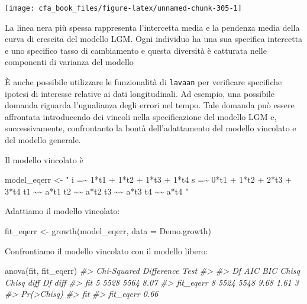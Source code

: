 \documentclass[
  11pt,
]{krantz}
\makeatletter
\newenvironment{Shaded}{\begin{snugshade}}{\end{snugshade}}
\newcommand{\AttributeTok}[1]{\textcolor[rgb]{0.61,0.61,0.61}{#1}}
\newcommand{\CommentTok}[1]{\textcolor[rgb]{0.37,0.37,0.37}{\textit{#1}}}
\newcommand{\FunctionTok}[1]{\textcolor[rgb]{0,0,0}{#1}}
\newcommand{\NormalTok}[1]{#1}
\newcommand{\OtherTok}[1]{\textcolor[rgb]{0.37,0.37,0.37}{#1}}
\newcommand{\StringTok}[1]{\textcolor[rgb]{0.5,0.5,0.5}{#1}}
\newenvironment{kframe}{%
\medskip{}
\setlength{\fboxsep}{.8em}
 \def\at@end@of@kframe{}%
 \ifinner\ifhmode%
  \def\at@end@of@kframe{\end{minipage}}%
  \begin{minipage}{\columnwidth}%
 \fi\fi%
 \def\FrameCommand##1{\hskip\@totalleftmargin \hskip-\fboxsep
 \colorbox{shadecolor}{##1}\hskip-\fboxsep
     \hskip-\linewidth \hskip-\@totalleftmargin \hskip\columnwidth}%
 \MakeFramed {\advance\hsize-\width
   \@totalleftmargin\z@ \linewidth\hsize
   \@setminipage}}%
 {\par\unskip\endMakeFramed%
 \at@end@of@kframe}
\renewenvironment{Shaded}{\begin{kframe}}{\end{kframe}}
\theoremstyle{definition}
\theoremstyle{definition}
\theoremstyle{definition}
\theoremstyle{definition}
\theoremstyle{remark}
\makeatother
\begin{document}
\begin{center}\texttt{[image: cfa\_book\_files/figure-latex/unnamed-chunk-305-1]} \end{center}

La linea nera più spessa rappresenta l'intercetta media e la pendenza media della curva di crescita del modello LGM. Ogni individuo ha una sua specifica intercetta e uno specifico tasso di cambiamento e questa diversità è catturata nelle componenti di varianza del modello

È anche possibile utilizzare le funzionalità di \texttt{lavaan} per verificare specifiche ipotesi di interesse relative ai dati longitudinali. Ad esempio, una possibile domanda riguarda l'ugualianza degli errori nel tempo. Tale domanda può essere affrontata introducendo dei vincoli nella specificazione del modello LGM e, successivamente, confrontanto la bontà dell'adattamento del modello vincolato e del modello generale.

Il modello vincolato è

\begin{Shaded}
\begin{Highlighting}[]
\NormalTok{model\_eqerr }\OtherTok{\textless{}{-}} \StringTok{"}
\StringTok{ i =\textasciitilde{} 1*t1 + 1*t2 + 1*t3 + 1*t4}
\StringTok{ s =\textasciitilde{} 0*t1 + 1*t2 + 2*t3 + 3*t4}
\StringTok{ t1 \textasciitilde{}\textasciitilde{} a*t1}
\StringTok{ t2 \textasciitilde{}\textasciitilde{} a*t2}
\StringTok{ t3 \textasciitilde{}\textasciitilde{} a*t3}
\StringTok{ t4 \textasciitilde{}\textasciitilde{} a*t4}
\StringTok{"}
\end{Highlighting}
\end{Shaded}

Adattiamo il modello vincolato:

\begin{Shaded}
\begin{Highlighting}[]
\NormalTok{fit\_eqerr }\OtherTok{\textless{}{-}} \FunctionTok{growth}\NormalTok{(model\_eqerr, }\AttributeTok{data =}\NormalTok{ Demo.growth)}
\end{Highlighting}
\end{Shaded}

Confrontiamo il modello vincolato con il modello libero:

\begin{Shaded}
\begin{Highlighting}[]
\FunctionTok{anova}\NormalTok{(fit, fit\_eqerr)}
\CommentTok{\#\textgreater{} Chi{-}Squared Difference Test}
\CommentTok{\#\textgreater{} }
\CommentTok{\#\textgreater{}           Df  AIC  BIC Chisq Chisq diff Df diff}
\CommentTok{\#\textgreater{} fit        5 5528 5564  8.07                   }
\CommentTok{\#\textgreater{} fit\_eqerr  8 5524 5548  9.68       1.61       3}
\CommentTok{\#\textgreater{}           Pr(\textgreater{}Chisq)}
\CommentTok{\#\textgreater{} fit                 }
\CommentTok{\#\textgreater{} fit\_eqerr       0.66}
\end{Highlighting}
\end{Shaded}
\end{document}
